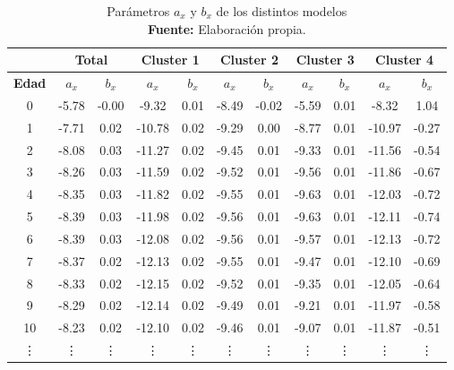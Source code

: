 \documentclass{article}
\begin{document}
\begin{table}[H]
\centering
\begin{tabular}{c|cc|cc|cc|cc|cc}
             & \multicolumn{2}{c}{Total} & \multicolumn{2}{c}{Cluster 1} & \multicolumn{2}{c}{Cluster 2} & \multicolumn{2}{c}{Cluster 3} & \multicolumn{2}{c}{Cluster 4} \\ \hline
\textbf{Edad} & $a_x$       & $b_x$       & $a_x$          & $b_x$        & $a_x$         & $b_x$         & $a_x$         & $b_x$         & $a_x$          & $b_x$        \\ \hline
0            & -5.78       & -0.00       & -9.32          & 0.01         & -8.49         & -0.02         & -5.59         & 0.01          & -8.32          & 1.04         \\
1            & -7.71       & 0.02        & -10.78         & 0.02         & -9.29         & 0.00          & -8.77         & 0.01          & -10.97         & -0.27        \\
2            & -8.08       & 0.03        & -11.27         & 0.02         & -9.45         & 0.01          & -9.33         & 0.01          & -11.56         & -0.54        \\
3            & -8.26       & 0.03        & -11.59         & 0.02         & -9.52         & 0.01          & -9.56         & 0.01          & -11.86         & -0.67        \\
4            & -8.35       & 0.03        & -11.82         & 0.02         & -9.55         & 0.01          & -9.63         & 0.01          & -12.03         & -0.72        \\
5            & -8.39       & 0.03        & -11.98         & 0.02         & -9.56         & 0.01          & -9.63         & 0.01          & -12.11         & -0.74        \\
6            & -8.39       & 0.03        & -12.08         & 0.02         & -9.56         & 0.01          & -9.57         & 0.01          & -12.13         & -0.72        \\
7            & -8.37       & 0.02        & -12.13         & 0.02         & -9.55         & 0.01          & -9.47         & 0.01          & -12.10         & -0.69        \\
8            & -8.33       & 0.02        & -12.15         & 0.02         & -9.52         & 0.01          & -9.35         & 0.01          & -12.05         & -0.64        \\
9            & -8.29       & 0.02        & -12.14         & 0.02         & -9.49         & 0.01          & -9.21         & 0.01          & -11.97         & -0.58        \\
10           & -8.23       & 0.02        & -12.10         & 0.02         & -9.46         & 0.01          & -9.07         & 0.01          & -11.87         & -0.51   \\
   \vdots          & \vdots       & \vdots        & \vdots        & \vdots         & \vdots         & \vdots          & \vdots         & \vdots          & \vdots        & \vdots 
\end{tabular}
\caption{Parámetros $a_{x}$ y $b_{x}$ de los distintos modelos\\ \textbf{Fuente:} Elaboración propia.}
\end{table}
\end{document}
